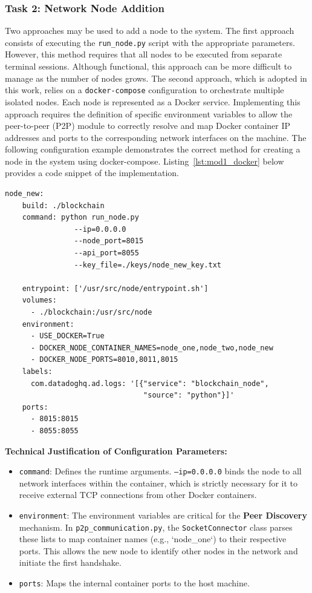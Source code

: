 \subsubsection*{Task 2: Network Node Addition}
Two approaches may be used to add a node to the system. The first approach consists of executing the \texttt{run\_node.py} script with the appropriate parameters. However, this method requires that all nodes to be executed from separate terminal sessions. Although functional, this approach can be more difficult to manage as the number of nodes grows. The second approach, which is adopted in this work, relies on a \texttt{docker-compose} configuration to orchestrate multiple isolated nodes. Each node is represented as a Docker service. Implementing this approach requires the definition of specific environment variables to allow the peer-to-peer (P2P) module to correctly resolve and map Docker container IP addresses and ports to the corresponding network interfaces on the machine. The following configuration example demonstrates the correct method for creating a node in the system using docker-compose. Listing~\ref{lst:mod1_docker} below provides a code snippet of the implementation.
\newpage
\begin{lstlisting}[caption=Docker Compose code snippet, label=lst:mod1_docker]
node_new:
    build: ./blockchain
    command: python run_node.py 
                --ip=0.0.0.0 
                --node_port=8015 
                --api_port=8055 
                --key_file=./keys/node_new_key.txt

    entrypoint: ['/usr/src/node/entrypoint.sh']
    volumes:
      - ./blockchain:/usr/src/node
    environment:
      - USE_DOCKER=True
      - DOCKER_NODE_CONTAINER_NAMES=node_one,node_two,node_new
      - DOCKER_NODE_PORTS=8010,8011,8015
    labels:
      com.datadoghq.ad.logs: '[{"service": "blockchain_node", 
                                "source": "python"}]'
    ports:
      - 8015:8015
      - 8055:8055
\end{lstlisting}

\textbf{Technical Justification of Configuration Parameters:}
\begin{itemize}
    \item \texttt{command}: Defines the runtime arguments. \texttt{--ip=0.0.0.0} binds the node to all network interfaces within the container, which is strictly necessary for it to receive external TCP connections from other Docker containers.
    \item \texttt{environment}: The environment variables are critical for the \textbf{Peer Discovery} mechanism. In \texttt{p2p\_communication.py}, the \texttt{SocketConnector} class parses these lists to map container names (e.g., `node\_one`) to their respective ports. This allows the new node to identify other nodes in the network and initiate the first handshake.
    \item \texttt{ports}: Maps the internal container ports to the host machine.
\end{itemize}
\newpage
